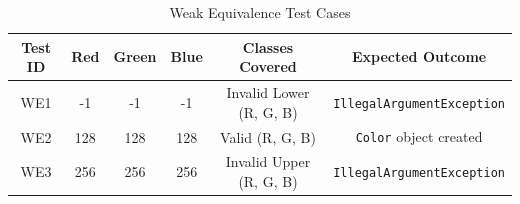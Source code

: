 \documentclass[11pt, a4paper]{article}
\begin{document}
\begin{table}[H]
\centering
\caption{Weak Equivalence Test Cases}
\label{tab:color_weak_equivalence}
\begin{tabular}{cccccc}
\toprule
\textbf{Test ID} & \textbf{Red} & \textbf{Green} & \textbf{Blue} & \textbf{Classes Covered} & \textbf{Expected Outcome} \\
\midrule
WE1 & -1  & -1  & -1  & Invalid Lower (R, G, B) & \texttt{IllegalArgumentException} \\
WE2 & 128 & 128 & 128 & Valid (R, G, B)         & \texttt{Color} object created \\
WE3 & 256 & 256 & 256 & Invalid Upper (R, G, B) & \texttt{IllegalArgumentException} \\
\bottomrule
\end{tabular}
\end{table}
\end{document}
